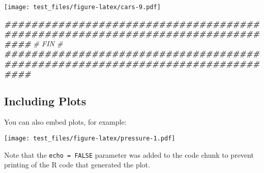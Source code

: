 \documentclass[
]{article}
\newenvironment{Shaded}{\begin{snugshade}}{\end{snugshade}}
\newcommand{\CommentTok}[1]{\textcolor[rgb]{0.56,0.35,0.01}{\textit{#1}}}
\newcommand{\DocumentationTok}[1]{\textcolor[rgb]{0.56,0.35,0.01}{\textbf{\textit{#1}}}}
\begin{document}
\texttt{[image: test\_files/figure-latex/cars-9.pdf]}

\begin{Shaded}
\begin{Highlighting}[]
\DocumentationTok{\#\#\#\#\#\#\#\#\#\#\#\#\#\#\#\#\#\#\#\#\#\#\#\#\#\#\#\#\#\#\#\#\#\#\#\#\#\#\#\#\#\#\#\#\#\#\#\#\#\#\#\#\#\#\#\#\#\#\#\#\#\#\#\#\#\#\#\#\#\#\#\#\#\#\#\#\#\#\#\#}
\CommentTok{\#                                    FIN                                       \#}
\DocumentationTok{\#\#\#\#\#\#\#\#\#\#\#\#\#\#\#\#\#\#\#\#\#\#\#\#\#\#\#\#\#\#\#\#\#\#\#\#\#\#\#\#\#\#\#\#\#\#\#\#\#\#\#\#\#\#\#\#\#\#\#\#\#\#\#\#\#\#\#\#\#\#\#\#\#\#\#\#\#\#\#\#}
\end{Highlighting}
\end{Shaded}

\subsection{Including Plots}\label{including-plots}

You can also embed plots, for example:

\texttt{[image: test\_files/figure-latex/pressure-1.pdf]}

Note that the \texttt{echo\ =\ FALSE} parameter was added to the code
chunk to prevent printing of the R code that generated the plot.
\end{document}
